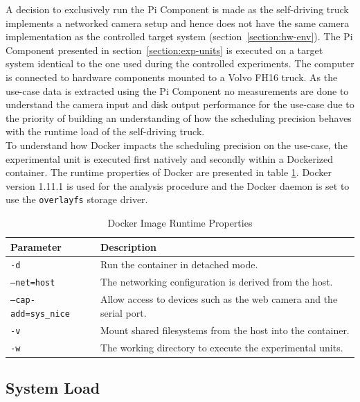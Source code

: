 A decision to exclusively run the Pi Component is made as the self-driving truck implements a networked camera setup and hence does not have the same camera implementation as the controlled target system (section~\ref{section:hw-env}). The Pi Component presented in section~\ref{section:exp-units} is executed on a target system identical to the one used during the controlled experiments. The computer is connected to hardware components mounted to a Volvo FH16 truck. As the use-case data is extracted using the Pi Component no measurements are done to understand the camera input and disk output performance for the use-case due to the priority of building an understanding of how the scheduling precision behaves with the runtime load of the self-driving truck.\\

To understand how Docker impacts the scheduling precision on the use-case, the experimental unit is executed first natively and secondly within a Dockerized container. The runtime properties of Docker are presented in table \ref{docker-parameters-truck}. Docker version 1.11.1 is used for the analysis procedure and the Docker daemon is set to use the \texttt{overlayfs} storage driver.



\begin{table}[ht]
\centering
\caption{Docker Image Runtime Properties}
\label{docker-parameters-truck}
\begin{tabular}{|l|p{10cm}|}
\hline
\textbf{Parameter}           & \textbf{Description}                                            \\ \hline
\texttt{-d}                  & Run the container in detached mode.                             \\ \hline
\texttt{--net=host}          & The networking configuration is derived from the host.          \\ \hline
\texttt{--cap-add=sys\_nice} & Allow access to devices such as the web camera and the serial port. \\ \hline
\texttt{-v}                  & Mount shared filesystems from the host into the container.    \\ \hline
\texttt{-w}                  & The working directory to execute the experimental units.               \\ \hline
\end{tabular}
\end{table}


\subsection{System Load}
\label{sec:truck-load}

